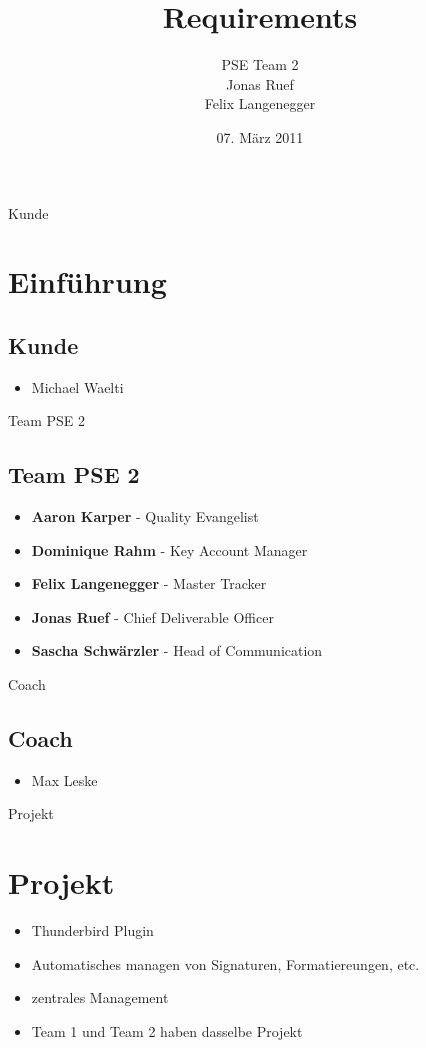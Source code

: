 \documentclass{beamer}
\title{Requirements}
\author{PSE Team 2\\Jonas Ruef
\\Felix Langenegger}
\date{07. März 2011}
\begin{document}
\maketitle
{}
\begin{frame}{Kunde}
\section{Einführung}
\subsection{Kunde}
\begin{itemize}
 \item Michael Waelti
\end{itemize}
\end{frame}
\begin{frame}{Team PSE 2}
\subsection{Team PSE 2}
\begin{itemize}
 \item \textbf{Aaron Karper} - Quality Evangelist
 \item \textbf{Dominique Rahm} - Key Account Manager
 \item \textbf{Felix Langenegger} - Master Tracker
 \item \textbf{Jonas Ruef} - Chief Deliverable Officer
 \item \textbf{Sascha Schwärzler} - Head of Communication
\end{itemize}
\end{frame}
\begin{frame}{Coach}
\subsection{Coach}
\begin{itemize}
 \item Max Leske
\end{itemize}
\end{frame}
\begin{frame}{Projekt}
\section{Projekt}
\begin{itemize}
 \item Thunderbird Plugin
 \item Automatisches managen von Signaturen, Formatiereungen, etc.
 \item zentrales Management
\item Team 1 und Team 2 haben dasselbe Projekt
\end{itemize}

\end{frame}
\end{document}
